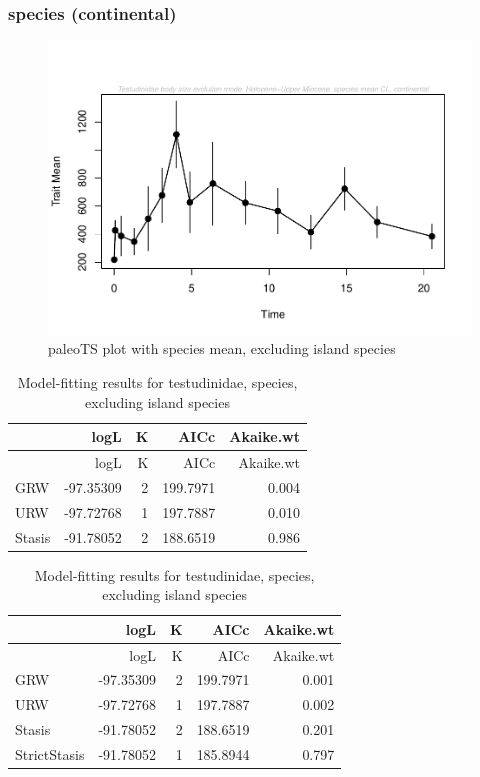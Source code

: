 \documentclass[]{article}
\begin{document}
\newpage

\subsubsection{species (continental)}\label{species-continental}

\begin{figure}[htbp]
\centering
\includegraphics{MA_JJ_files/figure-latex/paleoTS plot with species mean, excluding island species-1.pdf}
\caption{paleoTS plot with species mean, excluding island species}
\end{figure}

\begin{longtable}[]{@{}lrrrr@{}}
\caption{Model-fitting results for testudinidae, species, excluding
island species}\tabularnewline
\toprule
& logL & K & AICc & Akaike.wt\tabularnewline
\midrule
\endfirsthead
\toprule
& logL & K & AICc & Akaike.wt\tabularnewline
\midrule
\endhead
GRW & -97.35309 & 2 & 199.7971 & 0.004\tabularnewline
URW & -97.72768 & 1 & 197.7887 & 0.010\tabularnewline
Stasis & -91.78052 & 2 & 188.6519 & 0.986\tabularnewline
\bottomrule
\end{longtable}

\begin{longtable}[]{@{}lrrrr@{}}
\caption{Model-fitting results for testudinidae, species, excluding
island species}\tabularnewline
\toprule
& logL & K & AICc & Akaike.wt\tabularnewline
\midrule
\endfirsthead
\toprule
& logL & K & AICc & Akaike.wt\tabularnewline
\midrule
\endhead
GRW & -97.35309 & 2 & 199.7971 & 0.001\tabularnewline
URW & -97.72768 & 1 & 197.7887 & 0.002\tabularnewline
Stasis & -91.78052 & 2 & 188.6519 & 0.201\tabularnewline
StrictStasis & -91.78052 & 1 & 185.8944 & 0.797\tabularnewline
\bottomrule
\end{longtable}
\end{document}
